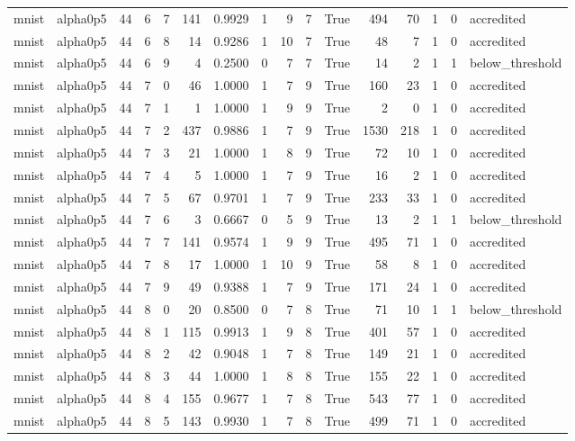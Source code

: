 \begin{tabular}{llrrrrrrrrrrrrrl}
mnist & alpha0p5 & 44 & 6 & 7 & 141 & 0.9929 & 1 & 9 & 7 & True & 494 & 70 & 1 & 0 & accredited \\
mnist & alpha0p5 & 44 & 6 & 8 & 14 & 0.9286 & 1 & 10 & 7 & True & 48 & 7 & 1 & 0 & accredited \\
mnist & alpha0p5 & 44 & 6 & 9 & 4 & 0.2500 & 0 & 7 & 7 & True & 14 & 2 & 1 & 1 & below\_threshold \\
mnist & alpha0p5 & 44 & 7 & 0 & 46 & 1.0000 & 1 & 7 & 9 & True & 160 & 23 & 1 & 0 & accredited \\
mnist & alpha0p5 & 44 & 7 & 1 & 1 & 1.0000 & 1 & 9 & 9 & True & 2 & 0 & 1 & 0 & accredited \\
mnist & alpha0p5 & 44 & 7 & 2 & 437 & 0.9886 & 1 & 7 & 9 & True & 1530 & 218 & 1 & 0 & accredited \\
mnist & alpha0p5 & 44 & 7 & 3 & 21 & 1.0000 & 1 & 8 & 9 & True & 72 & 10 & 1 & 0 & accredited \\
mnist & alpha0p5 & 44 & 7 & 4 & 5 & 1.0000 & 1 & 7 & 9 & True & 16 & 2 & 1 & 0 & accredited \\
mnist & alpha0p5 & 44 & 7 & 5 & 67 & 0.9701 & 1 & 7 & 9 & True & 233 & 33 & 1 & 0 & accredited \\
mnist & alpha0p5 & 44 & 7 & 6 & 3 & 0.6667 & 0 & 5 & 9 & True & 13 & 2 & 1 & 1 & below\_threshold \\
mnist & alpha0p5 & 44 & 7 & 7 & 141 & 0.9574 & 1 & 9 & 9 & True & 495 & 71 & 1 & 0 & accredited \\
mnist & alpha0p5 & 44 & 7 & 8 & 17 & 1.0000 & 1 & 10 & 9 & True & 58 & 8 & 1 & 0 & accredited \\
mnist & alpha0p5 & 44 & 7 & 9 & 49 & 0.9388 & 1 & 7 & 9 & True & 171 & 24 & 1 & 0 & accredited \\
mnist & alpha0p5 & 44 & 8 & 0 & 20 & 0.8500 & 0 & 7 & 8 & True & 71 & 10 & 1 & 1 & below\_threshold \\
mnist & alpha0p5 & 44 & 8 & 1 & 115 & 0.9913 & 1 & 9 & 8 & True & 401 & 57 & 1 & 0 & accredited \\
mnist & alpha0p5 & 44 & 8 & 2 & 42 & 0.9048 & 1 & 7 & 8 & True & 149 & 21 & 1 & 0 & accredited \\
mnist & alpha0p5 & 44 & 8 & 3 & 44 & 1.0000 & 1 & 8 & 8 & True & 155 & 22 & 1 & 0 & accredited \\
mnist & alpha0p5 & 44 & 8 & 4 & 155 & 0.9677 & 1 & 7 & 8 & True & 543 & 77 & 1 & 0 & accredited \\
mnist & alpha0p5 & 44 & 8 & 5 & 143 & 0.9930 & 1 & 7 & 8 & True & 499 & 71 & 1 & 0 & accredited \\

\end{tabular}
